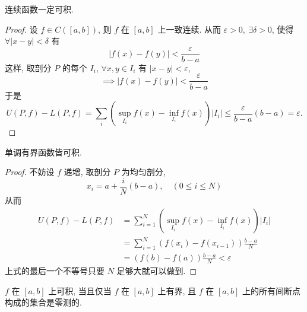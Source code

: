\begin{theorem}
  连续函数一定可积.
\end{theorem}
\begin{proof}
  设 $f \in C\left( [a,b] \right)$, 则 $f$ 在 $[a,b]$ 上一致连续.
  从而 $\varepsilon > 0, \ \exists \delta > 0$, 使得 $\forall \left| x-y \right| < \delta$ 有
  \begin{equation}
    \left| f(x) - f(y) \right| < \frac{\varepsilon}{b-a}
  \end{equation}
  这样, 取剖分 $P$ 的每个 $I_i$, $\forall x, y \in I_i$ 有 $\left| x-y \right|< \varepsilon$,
  \begin{equation}
    \implies \left| f(x) - f(y) \right| < \frac{\varepsilon}{b-a}
  \end{equation}
  于是
  \begin{equation}
    U(P,f) - L(P,f) = \sum_{i}  \left( \sup_{I_i} f(x) - \inf_{I_i} f(x) \right) \left| I_i \right| \le \frac{\varepsilon}{b-a} \left( b-a \right) = \varepsilon.
  \end{equation}
\end{proof}

\begin{theorem}
  单调有界函数皆可积.
\end{theorem}
\begin{proof}
  不妨设 $f$ 递增, 取剖分 $P$ 为均匀剖分, 
  \begin{equation}
    x_i = a + \frac{i}{N} \left( b-a \right), \quad (0 \le i \le N)
  \end{equation}
  从而
  \begin{equation}
    \begin{aligned}
      U(P,f) - L(P,f) & = \sum_{i=1}^{N} \left( \sup _{I_i} f(x) - \inf _{I_i} f(x) \right)\left| I_i \right|
    \\
                      & = \sum_{i=1}^{N} \left( f(x_{i}) - f(x_{i-1}) \right) \frac{b-a}{N} \\
                      & = \left( f(b) - f(a) \right) \frac{b-a}{N} < \varepsilon
    \end{aligned}
  \end{equation}
  上式的最后一个不等号只要 $N$ 足够大就可以做到.
\end{proof}

\begin{theorem}
  $f$ 在 $[a,b]$ 上可积, 当且仅当 $f$ 在 $[a,b]$ 上有界, 且 $f$ 在 $[a,b]$ 上的所有间断点构成的集合是零测的.
\end{theorem}

